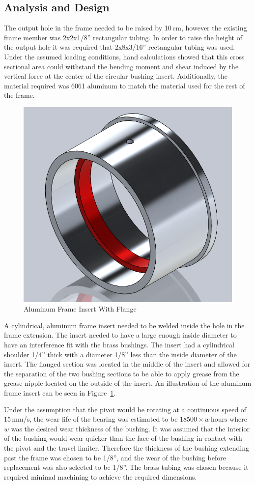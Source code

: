 \subsection{Analysis and Design}
The output hole in the frame needed to be raised by 10\,cm, however the existing frame member was 2x2x1/8'' rectangular tubing. In order to raise the height of the output hole it was required that 2x8x3/16'' rectangular tubing was used. Under the assumed loading conditions, hand calculations showed that this cross sectional area could withstand the bending moment and shear induced by the vertical force at the center of the circular bushing insert. Additionally, the material required was 6061 aluminum to match the material used for the rest of the frame. 
\begin{figure}[H]
\centering
\includegraphics[width=0.25\linewidth]{./images/frame_insert_iso_rndr}
\caption{Aluminum Frame Insert With Flange}
\label{fig:frame_insert_iso_rndr}
\end{figure}

A cylindrical, aluminum frame insert needed to be welded inside the hole in the frame extension. The insert needed to have a large enough inside diameter to have an interference fit with the brass bushings. The insert had a cylindrical shoulder 1/4'' thick with a diameter 1/8'' less than the inside diameter of the insert. The flanged section was located in the middle of the insert and allowed for the separation of the two bushing sections to be able to apply grease from the grease nipple located on the outside of the insert. An illustration of the aluminum frame insert can be seen in Figure~\ref{fig:frame_insert_iso_rndr}.

Under the assumption that the pivot would be rotating at a continuous speed of 15\,mm/s, the wear life of the bearing was estimated to be $18500\times w\,\text{hours}$ where $w$ was the desired wear thickness of the bushing. It was assumed that the interior of the bushing would wear quicker than the face of the bushing in contact with the pivot and the travel limiter. Therefore the thickness of the bushing extending past the frame was chosen to be 1/8'', and the wear of the bushing before replacement was also selected to be 1/8''. The brass tubing was chosen because it required minimal machining to achieve the required dimensions. 